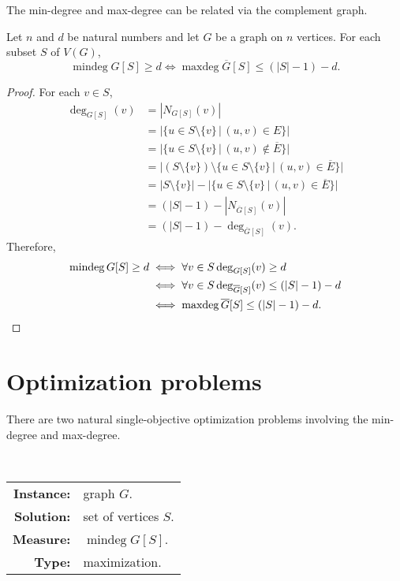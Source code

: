 \documentclass{article}
\DeclareMathOperator{\mindeg}{mindeg}
\DeclareMathOperator{\maxdeg}{maxdeg}
\begin{document}
The min-degree and max-degree can be related via the complement graph.

\begin{lemma}\label{lem:minmax}
  Let $n$ and $d$ be natural numbers and let $G$ be a graph on $n$ vertices.
  For each subset $S$ of $V(G)$,
  \[
  \mindeg G[S] \geq d \iff \maxdeg \overline{G}[S] \leq (|S| - 1) - d.
  \]
\end{lemma}
\begin{proof}
  For each $v \in S$,
  \begin{align*}
    \deg_{G[S]}(v) & = |N_{G[S]}(v)| \\
    & = |\{ u \in S \setminus \{v\} \, | \, (u, v) \in E\}| \\
    & = |\{ u \in S \setminus \{v\} \, | \, (u, v) \notin \overline{E}\}| \\
    & = |(S \setminus \{v\}) \setminus \{ u \in S \setminus \{v\} \, | \, (u, v) \in \overline{E}\}| \\
    & = |S \setminus \{v\}| - |\{ u \in S \setminus \{v\} \, | \, (u, v) \in \overline{E}\}| \\
    & = (|S| - 1) - |N_{\overline{G}[S]}(v)| \\
    & = (|S| - 1) - \deg_{\overline{G}[S]}(v).
  \end{align*}
  Therefore,
  \begin{align*}
    \mindeg G[S] \geq d & \iff \forall v \in S \deg_{G[S]}(v) \geq d \\
    & \iff \forall v \in S \deg_{\overline{G}[S]}(v) \leq (|S| - 1) - d \\
    & \iff \maxdeg \overline{G}[S] \leq (|S| - 1) - d. \qedhere
  \end{align*}
\end{proof}

\section{Optimization problems}

There are two natural single-objective optimization problems involving the min-degree and max-degree.

\begin{definition}
  \mbox{} \\
  \begin{tabular}{r p{9.5cm}}
    \textbf{Instance:} & graph $G$. \\
    \textbf{Solution:} & set of vertices $S$. \\
    \textbf{Measure:} & $\mindeg G[S]$. \\
    \textbf{Type:} & maximization.
  \end{tabular}
\end{definition}
\end{document}
